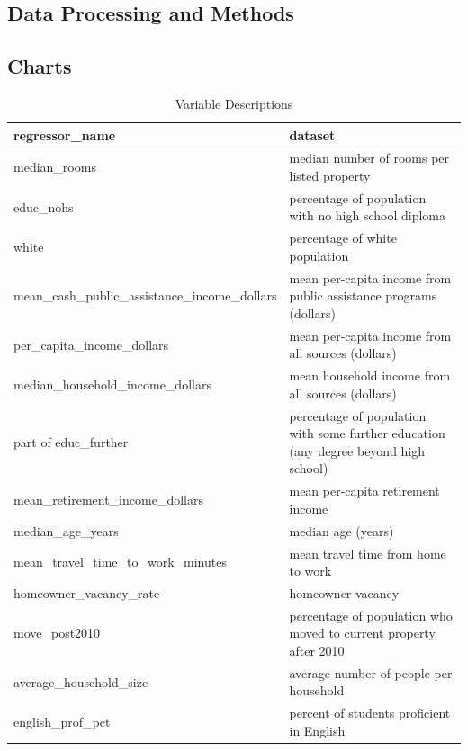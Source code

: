 
\subsection{Data Processing and Methods}\label{subsection_data_processing_and_methods}

\clearpage

\subsection{Charts}

\begin{table}
    \centering
    \caption{Variable Descriptions}\label{variable_descriptions}
    \begin{tabular}{l|l}
    \hline
        \textbf{regressor\_name} &         \textbf{dataset} \\
    \hline
    \hline
    median\_rooms &  median number of rooms per listed property \\ \hline
    educ\_nohs &  percentage of population with no high school diploma \\ \hline
    white &  percentage of white population \\ \hline
        mean\_cash\_public\_assistance\_income\_dollars &  mean per-capita income from public assistance programs (dollars) \\ \hline
    per\_capita\_income\_dollars &  mean per-capita income from all sources (dollars) \\ \hline
    median\_household\_income\_dollars &  mean household income from all sources (dollars) \\ \hline
    part of educ\_further &  percentage of population with some further education (any degree beyond high school) \\ \hline
    mean\_retirement\_income\_dollars &  mean per-capita retirement income \\ \hline
        median\_age\_years &  median age (years) \\ \hline
    mean\_travel\_time\_to\_work\_minutes &  mean travel time from home to work \\ \hline
    homeowner\_vacancy\_rate &  homeowner vacancy \\ \hline
    move\_post2010 &  percentage of population who moved to current property after 2010 \\ \hline
    average\_household\_size &  average number of people per household \\ \hline
    english\_prof\_pct &             percent of students proficient in English \\ \hline

\end{tabular}
\end{table}
